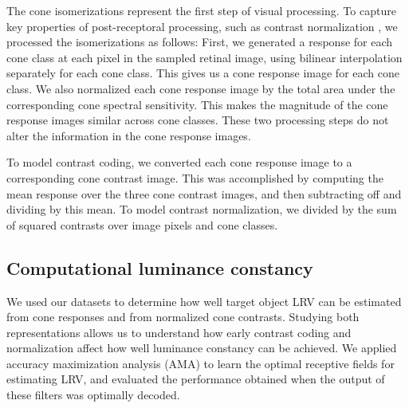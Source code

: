 \documentclass{jov}
\begin{document}
%

% 


The cone isomerizations represent the first step of visual processing.
To capture key properties of post-receptoral processing, such as contrast normalization \cite{heeger1992normalization,albrecht1991motion,carandini2012normalization},
we processed the isomerizations as follows:
First, we generated a response for each cone class at each pixel in the sampled retinal image, using bilinear interpolation separately for each cone class.
This gives us a cone response image for each cone class.
We also normalized each cone response image by the total area under the corresponding cone spectral sensitivity.
This makes the magnitude of the cone response images similar across cone classes.
These two processing steps do not alter the information in the cone response images. 

To model contrast coding, we converted each cone response image to a corresponding cone contrast image.
This was accomplished by computing the mean response over the three cone contrast images, and then subtracting off and dividing by this mean.
To model contrast normalization, we divided by the sum of squared contrasts over image pixels and cone classes.

\subsection{Computational luminance constancy} \label{method:SupervisedLearning}
We used our datasets to determine how well target object LRV can be estimated from cone responses and from normalized cone contrasts.
Studying both representations allows us to understand how early contrast coding and normalization affect how well luminance constancy can be achieved.
We applied accuracy maximization analysis (AMA) to learn the optimal receptive fields for estimating LRV,
and evaluated the performance obtained when the output of these filters was optimally decoded.
\end{document}
